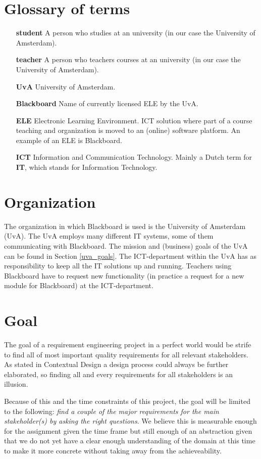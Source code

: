 \section{Glossary of terms}
\begin{itemize}
	\item[\textbf{student}] A person who studies at an university (in our case the University of Amsterdam).
	\item[\textbf{teacher}] A person who teachers courses at an university (in our case the University of Amsterdam).
	\item[\textbf{UvA}] University of Amsterdam. 
	\item[\textbf{Blackboard}] Name of currently licensed ELE by the UvA. 
	\item[\textbf{ELE}] Electronic Learning Environment. ICT solution where part of a course teaching and organization is moved to an (online) software platform. An example of an ELE is Blackboard.
	\item[\textbf{ICT}] Information and Communication Technology. Mainly a Dutch term for \textbf{IT}, which stands for Information Technology.
	
\end{itemize}

\section{Organization}
The organization in which Blackboard is used is the University of Amsterdam (UvA). The UvA employs many different IT systems, some of them communicating with Blackboard. The mission and (business) goals of the UvA can be found in Section \ref{uva_goals}. The ICT-department within the UvA has as responsibility to keep all the IT solutions up and running. Teachers using Blackboard have to request new functionality (in practice a request for a new module for Blackboard) at the ICT-department. 


\section{Goal}
The goal of a requirement engineering project in a perfect world would be strife to find all of most important quality requirements for all relevant stakeholders. As stated in Contextual Design \cite{contextual_design} a design process could always be further elaborated, so finding all and every requirements for all stakeholders is an illusion.

Because of this and the time constraints of this project, the goal will be limited to the following: \emph{find a couple of the major requirements for the main stakeholder(s) by asking the right questions}. We believe this is measurable enough for the assignment given the time frame but still enough of an abstraction given that we do not yet have a clear enough understanding of the domain at this time to make it more concrete without taking away from the achieveability.

